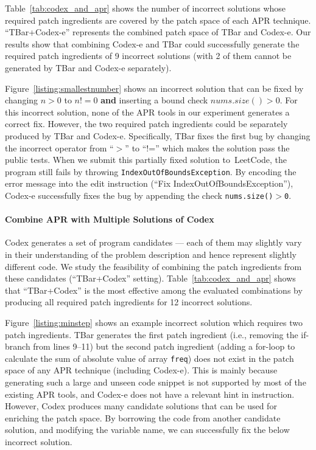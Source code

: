 Table~\ref{tab:codex_and_apr} shows the number of incorrect solutions whose required patch ingredients are covered by the patch space of each APR technique. ``TBar+Codex-e'' represents the combined patch space of TBar and Codex-e. Our results show that combining Codex-e and TBar could successfully generate the required patch ingredients of 9 incorrect solutions (with 2 of them cannot be generated by TBar and Codex-e separately).

Figure~\ref{listing:smallestnumber} shows an incorrect solution that can be fixed by changing $n{>}0$ to $n!{=}0$ \textbf{and} inserting a bound check $\mathit{nums.size}(){>}0$.
For this incorrect solution, none of the APR tools in our experiment generates a correct fix. However, the two required patch ingredients could be separately produced by TBar and Codex-e. Specifically, TBar fixes the first bug by changing the incorrect operator from ``$>$'' to ``!='' which makes the solution pass the public tests. When we submit this partially fixed solution to~LeetCode, the program still fails by throwing \texttt{IndexOutOfBoundsException}. 
By encoding the error message into the edit instruction (``Fix IndexOutOfBoundsException''), Codex-e successfully fixes the bug by appending the check \texttt{nums.size()$>$0}.

 \paragraph{\textbf{Combine APR with Multiple Solutions of Codex}} Codex generates a set of program candidates --- each of them may slightly vary in their understanding of the problem description and hence represent slightly different code. We study the feasibility of combining the patch ingredients from these candidates (``TBar+Codex'' setting). 
Table~\ref{tab:codex_and_apr} shows that ``TBar+Codex'' is the most effective among the evaluated combinations by producing all required patch ingredients for 12 incorrect solutions. 

Figure~\ref{listing:minstep} shows an example incorrect solution which requires two patch ingredients. TBar generates the first patch ingredient (i.e., removing the if-branch from lines 9--11) but the second patch ingredient (adding a for-loop to calculate the sum of absolute value of array \texttt{freq}) does not exist in the patch space of any APR technique (including Codex-e). This is mainly because generating such a large and unseen code snippet is not supported by most of the existing APR tools, and Codex-e does not have a relevant hint in instruction. However, Codex produces many candidate solutions that can be used for enriching the patch space. By borrowing the code from another candidate solution, and modifying the variable name, we can successfully fix the below incorrect solution.

